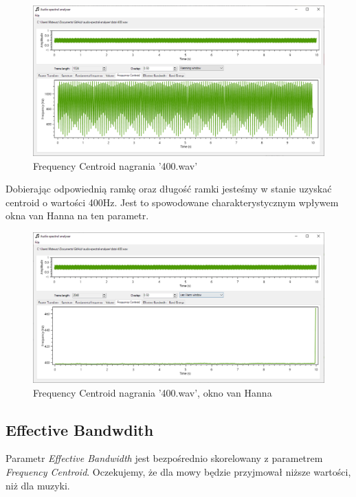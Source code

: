 \documentclass{article}
\begin{document}
\begin{figure}[H]
\includegraphics[width=6in]{scr6.png}
\centering
\caption{Frequency Centroid nagrania '400.wav'}
\end{figure}

\noindent Dobierając odpowiednią ramkę oraz długość ramki jesteśmy w stanie uzyskać centroid o wartości 400Hz. Jest to spowodowane charakterystycznym wpływem okna van Hanna na ten parametr.

\begin{figure}[H]
\includegraphics[width=6in]{scr7.png}
\centering
\caption{Frequency Centroid nagrania '400.wav', okno van Hanna}
\end{figure}

\subsection{Effective Bandwdith}
Parametr \textit{Effective Bandwidth} jest bezpośrednio skorelowany z parametrem \textit{Frequency Centroid}. Oczekujemy, że dla mowy będzie przyjmował niższe wartości, niż dla muzyki.
\end{document}
